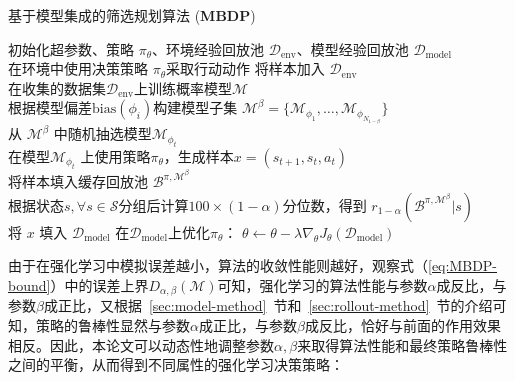 \begin{algorithm}[t]
\caption{基于模型集成的筛选规划算法 (\textbf{MBDP})}
\label{algo:our-method}
\begin{algorithmic}
\STATE 初始化超参数、策略 $\pi_\theta$、环境经验回放池 $\mathcal{D}_{\mathrm{env}}$、模型经验回放池 $\mathcal{D}_{\mathrm{model}}$\\
    \STATE 在环境中使用决策策略 $\pi_\theta$采取行动动作
    \STATE 将样本加入 $\mathcal{D}_{\mathrm{env}}$\\
        \STATE  在收集的数据集$\mathcal{D}_{\mathrm{env}}$上训练概率模型$\mathcal{M}$\\
        \STATE 根据模型偏差$\mathrm{bias}({\phi_i})$构建模型子集 $\mathcal{M}^\beta = \{\mathcal{M}_{\phi_1},\ldots,\mathcal{M}_{\phi_{N_{1-\beta}}}\}$\\
            \STATE 从 $\mathcal{M}^\beta$ 中随机抽选模型$\mathcal{M}_{\phi_t}$\\
            \STATE 在模型$\mathcal{M}_{\phi_t}$ 上使用策略$\pi_\theta$，生成样本$x=\left(s_{t+1},s_t,a_t\right)$ \\
            \STATE 将样本填入缓存回放池 $\mathcal{B}^{\pi,\mathcal{M}^\beta}$\\
        \ENDFOR
        \STATE 根据状态$s, \forall s\in\mathcal{S}$分组后计算$100\times(1-\alpha)$分位数，得到 $r_{1-\alpha}(\mathcal{B}^{\pi,\mathcal{M}^\beta}|s)$\\
                \STATE 将 $x$ 填入 $\mathcal{D}_{\mathrm{model}}$
            \ENDIF
        \ENDFOR
    \ENDFOR
    \STATE 在$\mathcal{D}_{\mathrm{model}}$上优化$\pi_\theta$： $\theta\leftarrow \theta - \lambda\nabla_\theta J_\theta(\mathcal{D}_{\mathrm{model}})$
\ENDFOR
\end{algorithmic}
\end{algorithm}


由于在强化学习中模拟误差越小，算法的收敛性能则越好，观察式（\ref{eq:MBDP-bound}）中的误差上界$D_{\alpha,\beta}(\mathcal{M})$可知，强化学习的算法性能与参数$\alpha$成反比，与参数$\beta$成正比，又根据~\ref{sec:model-method}~节和~\ref{sec:rollout-method}~节的介绍可知，策略的鲁棒性显然与参数$\alpha$成正比，与参数$\beta$成反比，恰好与前面的作用效果相反。因此，本论文可以动态性地调整参数$\alpha,\beta$来取得算法性能和最终策略鲁棒性之间的平衡，从而得到不同属性的强化学习决策策略：

